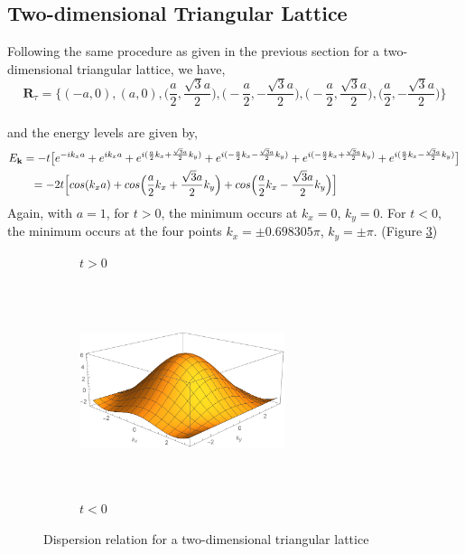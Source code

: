 \documentclass{article}
\begin{document}
\subsection{Two-dimensional Triangular Lattice}

Following the same procedure as given in the previous section for a two-dimensional triangular lattice, we have,
$$\textbf{R}_\tau = \Big\{(-a,0),(a,0), \Big(\frac{a}{2}, \frac{\sqrt{3}a}{2}\Big), \Big(-\frac{a}{2}, -\frac{\sqrt{3}a}{2}\Big),\Big(-\frac{a}{2}, \frac{\sqrt{3}a}{2}\Big),\Big(\frac{a}{2}, -\frac{\sqrt{3}a}{2}\Big) \Big\} $$
\\
and the energy levels are given by,
\\  
\begin{equation}
\begin{split}
\MoveEqLeft
E_\textbf{k} = -t \big[ e^{-i k_x a} + e^{i k_x a} + e^{i(\frac{a}{2} k_x +\frac{\sqrt{3}a}{2} k_y )}+ e^{i(-\frac{a}{2} k_x -\frac{\sqrt{3}a}{2} k_y )}+ e^{i(-\frac{a}{2} k_x +\frac{\sqrt{3}a}{2} k_y )} +e^{i(\frac{a}{2} k_x -\frac{\sqrt{3}a}{2} k_y )}   \big] \\
& = -2t \Big[cos(k_x a) + cos\Big(\frac{a}{2} k_x +\frac{\sqrt{3}a}{2} k_y\Big)  + cos\Big(\frac{a}{2} k_x -\frac{\sqrt{3}a}{2} k_y\Big)  \Big]
\end{split}
\end{equation}
Again, with $a=1$, for $t>0$, the minimum occurs at  $k_x =0$, $k_y=0$. For $t<0$, the minimum occurs at the four points $k_x = \pm 0.698305 \pi$, $k_y = \pm \pi$. (Figure \ref{fig:tri})

\begin{figure}[h]
\centering
\begin{subfigure}{.5\textwidth}
  \centering
  \caption{$t > 0$}
  \label{fig:sub3}
\end{subfigure}%
\begin{subfigure}{.5\textwidth}
  \centering
  \includegraphics[width= 6cm, height=6.2cm, keepaspectratio]{tltri.pdf}
  \caption{$t<0$}
  \label{fig:sub4}
\end{subfigure}
\caption{Dispersion relation for a two-dimensional triangular lattice}
\label{fig:tri}
\end{figure}
\end{document}
